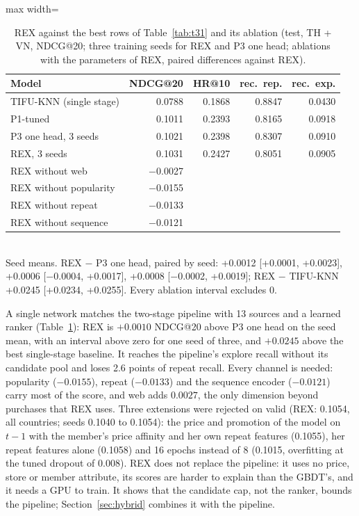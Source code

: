 \documentclass{ieeeaccess}
\begin{document}
\begin{table}[t]
\caption{REX against the best rows of Table~\ref{tab:t31} and its ablation (test, TH + VN, NDCG@20; three training seeds for
REX and P3 one head; ablations with the parameters of REX, paired differences against REX).}
\label{tab:rex}
\setlength{\tabcolsep}{3pt}
\centering
\begin{adjustbox}{max width=\columnwidth}
\begin{tabular}{lrrrr}
\toprule
Model & NDCG@20 & HR@10 & rec.\ rep. & rec.\ exp. \\
\midrule
TIFU-KNN (single stage)   & 0.0788 & 0.1868 & 0.8847 & 0.0430 \\
P1-tuned                  & 0.1011 & 0.2393 & 0.8165 & 0.0918 \\
P3 one head, 3 seeds      & 0.1021 & 0.2398 & 0.8307 & 0.0910 \\
REX, 3 seeds              & 0.1031 & 0.2427 & 0.8051 & 0.0905 \\
\midrule
REX without web           & $-$0.0027 & & & \\
REX without popularity    & $-$0.0155 & & & \\
REX without repeat        & $-$0.0133 & & & \\
REX without sequence      & $-$0.0121 & & & \\
\bottomrule
\end{tabular}
\end{adjustbox}
\\[1ex]
{\footnotesize Seed means. REX $-$ P3 one head, paired by seed: +0.0012 [+0.0001, +0.0023], +0.0006 [$-$0.0004, +0.0017],
+0.0008 [$-$0.0002, +0.0019]; REX $-$ TIFU-KNN +0.0245 [+0.0234, +0.0255]. Every ablation interval excludes 0.}
\end{table}

A single network matches the two-stage pipeline with 13 sources and a learned ranker (Table~\ref{tab:rex}): REX is
$+0.0010$ NDCG@20 above P3 one head on the seed mean, with an interval above zero for one seed of three, and $+0.0245$ above the best
single-stage baseline. It reaches the pipeline's explore recall without its candidate pool and loses 2.6 points of repeat recall. Every channel is needed:
popularity ($-0.0155$), repeat ($-0.0133$) and the sequence encoder ($-0.0121$) carry most of the score, and web adds $0.0027$, the
only dimension beyond purchases that REX uses. Three extensions were rejected on valid (REX: 0.1054, all countries; seeds 0.1040 to
0.1054): the price and promotion of the model on $t - 1$ with the member's price affinity and her own repeat features (0.1055), her
repeat features alone (0.1058) and 16 epochs instead of 8 (0.1015, overfitting at the tuned dropout of 0.008). REX does not replace the pipeline: it uses
no price, store or member attribute, its scores are harder to explain than the GBDT's, and it needs a GPU to train. It shows that the
candidate cap, not the ranker, bounds the pipeline; Section~\ref{sec:hybrid} combines it with the pipeline.
\end{document}
